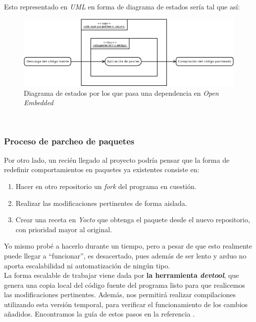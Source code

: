 Esto representado en \textit{UML} en forma de diagrama de estados sería tal que así:

\begin{figure}[H]
	\centering
	\includegraphics[width=\linewidth]{imagenes/statechart-parche.png}
	\caption{Diagrama de estados por los que pasa una dependencia en \textit{Open Embedded}}
	\label{statechart-parche}
\end{figure}

\noindent\makebox[\linewidth]{\rule{\textwidth}{0.4pt}}\\

\subsubsection{Proceso de parcheo de paquetes}

Por otro lado, un recién llegado al proyecto podría pensar que la forma de redefinir comportamientos en paquetes ya existentes consiste en:

\begin{enumerate}
	\item Hacer en otro repositorio un \textit{fork} del programa en cuestión.
	\item Realizar las modificaciones pertinentes de forma aislada.
	\item Crear una receta en \textit{Yocto} que obtenga el paquete desde el nuevo repositorio, con prioridad mayor al original.
\end{enumerate}

Yo mismo probé a hacerlo durante un tiempo, pero a pesar de que esto realmente puede llegar a ``funcionar'', es desacertado, pues además de ser lento y arduo no aporta escalabilidad ni automatización de ningún tipo.\\

La forma escalable de trabajar viene dada por \textbf{la herramienta \textit{devtool}}, que genera una copia local del código fuente del programa listo para que realicemos las modificaciones pertinentes. Además, nos permitirá realizar compilaciones utilizando esta versión temporal, para verificar el funcionamiento de los cambios añadidos. Encontramos la guía de estos pasos en la referencia \cite{wiki-yocto-patches}.\\

